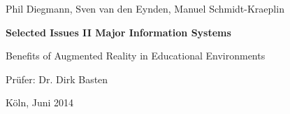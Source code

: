 \vspace*{1mm}

\thispagestyle{empty}
Phil Diegmann, Sven van den Eynden, Manuel Schmidt-Kraeplin

\vspace*{32mm}

% 
\begin{center}
\textbf{
    Selected Issues II
\linebreak
    Major Information Systems
}
\end{center}

\vspace*{32mm}

\begin{center}
\LARGE 
Benefits of Augmented Reality in Educational Environments
\end{center}

\vspace*{32mm}

\begin{center}
Prüfer: Dr. Dirk Basten
\end{center}

\vspace*{32mm}

\begin{center}
Köln, Juni 2014
\end{center}